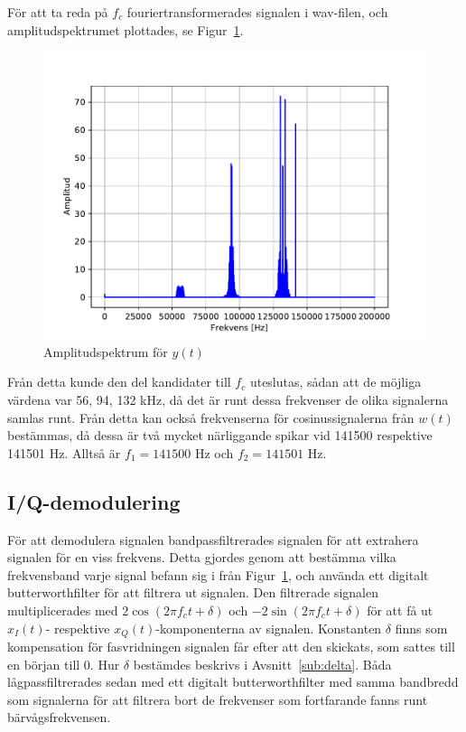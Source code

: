 \documentclass[10pt,twocolumn]{article}
\begin{document}
För att ta reda på $f_c$ fouriertransformerades signalen i wav-filen, och
amplitudspektrumet plottades, se Figur~\ref{fig:yamp}. 
\begin{figure}[h]
    \centering
    \includegraphics[width=\linewidth]{figures/yamp.pdf}
    \caption{Amplitudspektrum för $y(t)$}
    \label{fig:yamp}
\end{figure}
Från detta kunde den del kandidater till $f_c$ uteslutas, sådan att
de möjliga värdena var 56, 94, 132 kHz, då det är runt dessa frekvenser de
olika signalerna samlas runt. Från detta kan också frekvenserna för
cosinussignalerna från $w(t)$
bestämmas, då dessa är två mycket närliggande spikar vid 141500 respektive
141501 Hz. Alltså är $f_1=141500$ Hz och $f_2=141501$ Hz.

\subsection{I/Q-demodulering\label{sub:iq}}
För att demodulera signalen bandpassfiltrerades signalen för att extrahera
signalen för en viss frekvens. Detta gjordes genom att bestämma vilka
frekvensband varje signal befann sig i från Figur~\ref{fig:yamp}, och använda
ett digitalt butterworthfilter för att filtrera ut signalen. Den filtrerade
signalen multiplicerades med $2\cos(2\pi f_c t + \delta)$ och 
$-2\sin(2\pi f_c t + \delta)$ 
för att få ut $x_I(t)$- respektive $x_Q(t)$-komponenterna av signalen.
Konstanten $\delta$ finns som kompensation för fasvridningen signalen får efter
att den skickats, som sattes till en början till 0. Hur $\delta$ bestämdes
beskrivs i Avsnitt~\ref{sub:delta}. Båda
lågpassfiltrerades sedan med ett digitalt butterworthfilter med samma bandbredd
som signalerna för att filtrera
bort de frekvenser som fortfarande fanns runt bärvågsfrekvensen.
\end{document}
